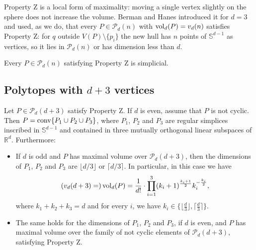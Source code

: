 \begin{remark}
  \label{rem:propertyz}
  Property Z is a local form of maximality: moving a single vertex slightly on
  the sphere does not increase the volume. Berman and Hanes
  \cite{berman-hanes-1970} introduced it for $d = 3$ and used, as we do,
  that every $P \in \mathcal{P}_{d}(n)$ with $\operatorname{vol}_{d}(P) = v_{d}(n)$
  satisfies Property Z: for $q$ outside $V(P) \setminus \{p_{i}\}$ the new hull has $n$
  points of $\mathbb{S}^{d-1}$ as vertices, so it lies in $\mathcal{P}_{d}(n)$
  or has dimension less than $d$.
\end{remark}

\begin{lemma}
  \label{lem:simplicial}
  Every $P \in \mathcal{P}_{d}(n)$ satisfying Property Z is simplicial.
\end{lemma}

\subsection{Polytopes with \texorpdfstring{$d+3$}{d+3} vertices}

\begin{theorem}
  \label{thm:hl}
  Let $P \in \mathcal{P}_{d}(d+3)$ satisfy Property Z. If $d$ is even, assume
  that $P$ is not cyclic. Then $P = \operatorname{conv}\{P_{1} \cup P_{2} \cup P_{3}\}$,
  where $P_{1}$, $P_{2}$ and $P_{3}$ are regular simplices inscribed in
  $\mathbb{S}^{d-1}$ and contained in three mutually orthogonal linear
  subspaces of $\mathbb{R}^{d}$. Furthermore:
  \begin{itemize}
    \item If $d$ is odd and $P$ has maximal volume over
      $\mathcal{P}_{d}(d+3)$, then the dimensions of $P_{1}$, $P_{2}$ and
      $P_{3}$ are $\lfloor d/3 \rfloor$ or $\lceil d/3 \rceil$. In particular,
      in this case we have
      \begin{equation*}
        (v_{d}(d+3) =) \operatorname{vol}_{d}(P) = \frac{1}{d!} \cdot \prod_{i=1}^{3}
          (k_{i}+1)^{\frac{k_{i}+1}{2}} k_{i}^{-\frac{k_{i}}{2}},
      \end{equation*}
      where $k_{1} + k_{2} + k_{3} = d$ and for every $i$, we have
      $k_{i} \in \{\lfloor \frac{d}{3} \rfloor, \lceil \frac{d}{3} \rceil\}$.
    \item The same holds for the dimensions of $P_{1}$, $P_{2}$ and $P_{3}$, if
      $d$ is even, and $P$ has maximal volume over the family of not cyclic
      elements of $\mathcal{P}_{d}(d+3)$, satisfying Property Z.
  \end{itemize}
\end{theorem}

